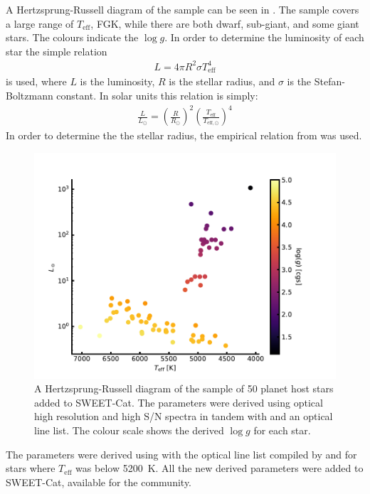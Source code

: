 A Hertzsprung-Russell diagram of the sample can be seen in . The sample covers a
large range of $T_\mathrm{eff}$, FGK, while there are both dwarf, sub-giant, and some giant stars.
The colours indicate the $\log g$. In order to determine the luminosity of each star the simple
relation
\begin{align*}
  L = 4\pi R^2 \sigma T^4_\mathrm{eff}
\end{align*}
is used, where $L$ is the luminosity, $R$ is the stellar radius, and $\sigma$ is the
Stefan-Boltzmann constant. In solar units this relation is simply:
\begin{align*}
  \frac{L}{L_\odot} = \left(\frac{R}{R_\odot}\right)^2 \left(\frac{T_\mathrm{eff}}{T_{\mathrm{eff},\odot}}\right)^4
\end{align*}
In order to determine the the stellar radius, the empirical relation from \citet{Torres2010} was
used.

\begin{figure}[htpb!]
    \centering
    \includegraphics[width=1.0\linewidth]{figures/HR.pdf}
    \caption{A Hertzsprung-Russell diagram of the sample of 50 planet host stars added to SWEET-Cat.
             The parameters were derived using optical high resolution and high S/N spectra in
             tandem with  and an optical line list. The colour scale shows the derived
             $\log g$ for each star.}
    \label{fig:sweetcat}
\end{figure}

The parameters were derived using  with the optical line list compiled by
\citet{Sousa2008a} and \citet{Tsantaki2013} for stars where $T_\mathrm{eff}$ was below \SI{5200}{K}.
All the new derived parameters were added to SWEET-Cat, available for the community.

